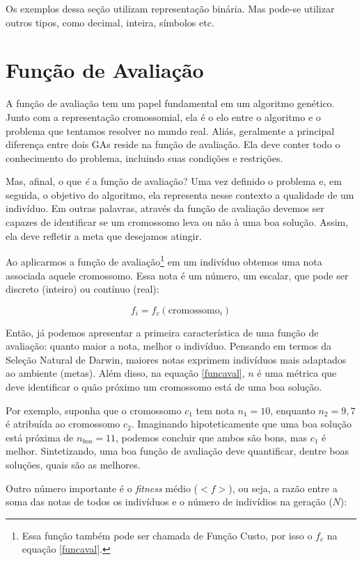 Os exemplos dessa seção utilizam representação binária. Mas pode-se utilizar outros tipos, como decimal, inteira, símbolos etc.
	
	\section{Função de Avaliação}
	
	A função de avaliação tem um papel fundamental em um algoritmo genético. Junto com a representação cromossomial, ela é o elo entre o algoritmo e o problema que tentamos resolver no mundo real. Aliás, geralmente a principal diferença entre dois GAs reside na função de avaliação. Ela deve conter todo o conhecimento do problema, incluindo suas condições e restrições.
	
	Mas, afinal, o que \textit{é} a função de avaliação? Uma vez definido o problema e, em seguida, o objetivo do algoritmo, ela representa nesse contexto a qualidade de um indivíduo. Em outras palavras, através da função de avaliação devemos ser capazes de identificar se um cromossomo leva ou não à uma boa solução. Assim, ela deve refletir a meta que desejamos atingir.
	
	Ao aplicarmos a função de avaliação\footnote{Essa função também pode ser chamada de Função Custo, por isso o $f_c$ na equação \ref{funcaval}.} em um indivíduo obtemos uma nota associada aquele cromossomo. Essa nota é um número, um escalar, que pode ser discreto (inteiro) ou contínuo (real):
	
	\begin{equation}\label{funcaval}
		f_i = f_c(\mbox{cromossomo}_i)
	\end{equation}
	
	Então, já podemos apresentar a primeira característica de uma função de avaliação: quanto maior a nota, melhor o indivíduo. Pensando em termos da Seleção Natural de Darwin, maiores notas exprimem indivíduos mais adaptados ao ambiente (metas). Além disso, na equação \ref{funcaval}, $n$ é uma métrica que deve identificar o quão próximo um cromossomo está de uma boa solução.
	
	Por exemplo, suponha que o cromossomo $c_1$ tem nota $n_1 = 10$, enquanto $n_2 = 9,7$ é atribuída ao cromossomo $c_2$. Imaginando hipoteticamente que uma boa solução está próxima de $n_{boa} = 11$, podemos concluir que ambos são bons, mas $c_1$ é melhor. Sintetizando, uma boa função de avaliação deve quantificar, dentre boas soluções, quais são as melhores.
	
	Outro número importante é o \textit{fitness} médio ($<f>$), ou seja, a razão entre a soma das notas de todos os indivíduos e o número de indivídios na geração ($N$):
	

